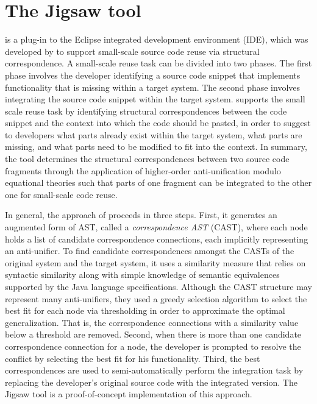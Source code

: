 \section{The Jigsaw tool}\label{Jigsaw}

 is a plug-in to the Eclipse integrated development environment (IDE), which was developed by \citet{2008:fse:cottrell} to support small-scale source code reuse via structural correspondence. A small-scale reuse task can be divided into two phases. The first phase involves the developer identifying a source code snippet that implements functionality that is missing within a target system. The second phase involves integrating the source code snippet within the target system.
 supports the small scale reuse task by identifying structural correspondences between the code snippet and the context into which the code should be pasted, in order to suggest to developers what parts already exist within the target system, what parts are missing, and what parts need to be modified to fit into the context. In summary, the  tool determines the structural correspondences between two  source code fragments through the application of higher-order anti-unification modulo equational theories such that parts of one fragment can be integrated to the other one for small-scale code reuse.


In general, the approach of \citeauthor{2008:fse:cottrell} proceeds in three steps. First, it generates an augmented form of AST, called a \emph{correspondence AST} (CAST), where each node holds a list of candidate correspondence connections, each implicitly representing an anti-unifier. To find candidate correspondences amongst the CASTs of the original system and the target system, it uses a similarity measure that relies on syntactic similarity along with simple knowledge of semantic equivalences supported by the Java language specifications. Although the CAST structure may represent many anti-unifiers, they used a greedy selection algorithm to select the best fit for each node via thresholding in order to approximate the optimal generalization. That is, the correspondence connections with a similarity value below a threshold are removed. Second, when there is more than one candidate correspondence connection for a node, the developer is prompted to resolve the conflict by selecting the best fit for his functionality. Third, the best correspondences are used to semi-automatically perform the integration task by replacing the developer's original source code with the integrated version. The Jigsaw tool is a proof-of-concept implementation of this approach.

